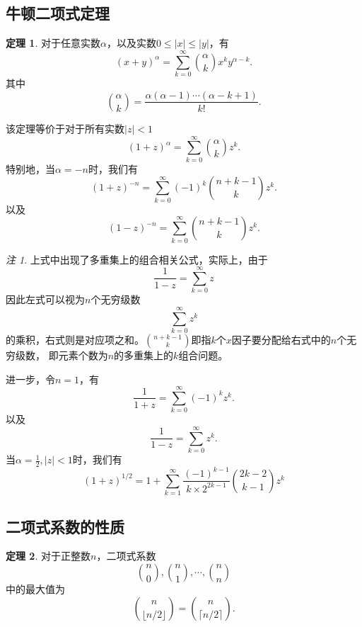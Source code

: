 \documentclass[a4paper,11pt]{article}%
\theoremstyle{remark}
\newtheorem*{remark}{注}
\theoremstyle{remark}
\theoremstyle{definition}
\newtheorem{theorem}{定理}[section]
\theoremstyle{definition}
\theoremstyle{definition}
\newcommand*{\abs}[1]{\lvert #1 \rvert}
\begin{document}
\subsection{牛顿二项式定理}
\begin{theorem}
    对于任意实数$\alpha$，以及实数$0\leq\abs{x}\leq\abs{y}$，有 
    \[(x+y)^\alpha=\sum_{k=0}^\infty\binom{\alpha}{k}x^ky^{\alpha-k}.\]
    其中 
    \[\binom{\alpha}{k}=\frac{\alpha(\alpha-1)\cdots(\alpha-k+1)}{k!}.\]
\end{theorem}
该定理等价于对于所有实数$\abs{z}<1$
\[(1+z)^\alpha=\sum_{k=0}^\infty\binom{\alpha}{k}z^k.\]
特别地，当$\alpha=-n$时，我们有 
\[(1+z)^{-n}=\sum_{k=0}^\infty(-1)^k\binom{n+k-1}{k}z^k.\]
以及
\[(1-z)^{-n}=\sum_{k=0}^\infty\binom{n+k-1}{k}z^k.\]
\begin{remark}
    上式中出现了多重集上的组合相关公式，实际上，由于
    \[\frac{1}{1-z}=\sum_{k=0}^{\infty}z\]
    因此左式可以视为$n$个无穷级数
    \[\sum_{k=0}^{\infty}z^k\]
    的乘积，右式则是对应项之和。$\binom{n+k-1}{k}$即指$k$个$x$因子要分配给右式中的$n$个无穷级数，
    即元素个数为$n$的多重集上的$k$组合问题。
\end{remark}
进一步，令$n=1$，有 
\[\frac{1}{1+z}=\sum_{k=0}^\infty(-1)^kz^k.\]
以及 
\[\frac{1}{1-z}=\sum_{k=0}^\infty z^k.\]
当$\alpha=\frac{1}{2},\abs{z}<1$时，我们有 
\[(1+z)^{1/2}=1+\sum_{k=1}^{\infty}\frac{(-1)^{k-1}}{k\times 2^{2k-1}}\binom{2k-2}{k-1}z^k\]

\subsection{二项式系数的性质}
\begin{theorem}
    对于正整数$n$，二项式系数
    \[\binom{n}{0},\binom{n}{1},\cdots,\binom{n}{n}\]
    中的最大值为
    \[\binom{n}{\lfloor n/2\rfloor}=\binom{n}{\lceil n/2\rceil}.\]
\end{theorem}
\end{document}
